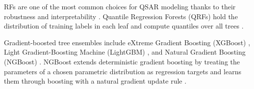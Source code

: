 RFs are one of the most common choices for QSAR modeling thanks to their robustness and interpretability \citep{Svetnik2003}. Quantile Regression Forests (QRFs) hold the distribution of training labels in each leaf and compute quantiles over all trees \citep{Meinshausen2006}.

Gradient-boosted tree ensembles include eXtreme Gradient Boosting (XGBoost) \citep{Mustapha2016, Tian2022}, Light Gradient-Boosting Machine (LightGBM) \citep{ke2017lightgbm}, and Natural Gradient Boosting (NGBoost) \citep{Duan2020}. NGBoost extends deterministic gradient boosting by treating the parameters of a chosen parametric distribution as regression targets and learns them through boosting with a natural gradient update rule \citep{Duan2020}.


